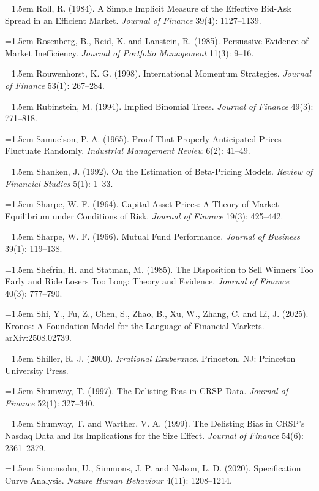 \hangindent=1.5em Roll, R. (1984). A Simple Implicit Measure of the Effective Bid-Ask Spread in an Efficient Market. \emph{Journal of Finance} 39(4): 1127--1139.

\hangindent=1.5em Rosenberg, B., Reid, K. and Lanstein, R. (1985). Persuasive Evidence of Market Inefficiency. \emph{Journal of Portfolio Management} 11(3): 9--16.

\hangindent=1.5em Rouwenhorst, K. G. (1998). International Momentum Strategies. \emph{Journal of Finance} 53(1): 267--284.

\hangindent=1.5em Rubinstein, M. (1994). Implied Binomial Trees. \emph{Journal of Finance} 49(3): 771--818.

\hangindent=1.5em Samuelson, P. A. (1965). Proof That Properly Anticipated Prices Fluctuate Randomly. \emph{Industrial Management Review} 6(2): 41--49.

\hangindent=1.5em Shanken, J. (1992). On the Estimation of Beta-Pricing Models. \emph{Review of Financial Studies} 5(1): 1--33.

\hangindent=1.5em Sharpe, W. F. (1964). Capital Asset Prices: A Theory of Market Equilibrium under Conditions of Risk. \emph{Journal of Finance} 19(3): 425--442.

\hangindent=1.5em Sharpe, W. F. (1966). Mutual Fund Performance. \emph{Journal of Business} 39(1): 119--138.

\hangindent=1.5em Shefrin, H. and Statman, M. (1985). The Disposition to Sell Winners Too Early and Ride Losers Too Long: Theory and Evidence. \emph{Journal of Finance} 40(3): 777--790.

\hangindent=1.5em Shi, Y., Fu, Z., Chen, S., Zhao, B., Xu, W., Zhang, C. and Li, J. (2025). Kronos: A Foundation Model for the Language of Financial Markets. arXiv:2508.02739.

\hangindent=1.5em Shiller, R. J. (2000). \emph{Irrational Exuberance}. Princeton, NJ: Princeton University Press.

\hangindent=1.5em Shumway, T. (1997). The Delisting Bias in CRSP Data. \emph{Journal of Finance} 52(1): 327--340.

\hangindent=1.5em Shumway, T. and Warther, V. A. (1999). The Delisting Bias in CRSP's Nasdaq Data and Its Implications for the Size Effect. \emph{Journal of Finance} 54(6): 2361--2379.

\hangindent=1.5em Simonsohn, U., Simmons, J. P. and Nelson, L. D. (2020). Specification Curve Analysis. \emph{Nature Human Behaviour} 4(11): 1208--1214.

